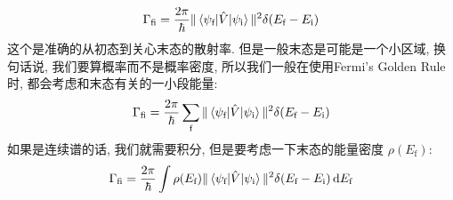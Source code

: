 \begin{equation}
  \Gamma_{\text{fi}} = \frac{2\pi}{\hbar} \|\mel{\psi_{\text{f}}}{\hat{V}}{\psi_{\text{i}}}\|^2 \delta(E_{\text{f}} - E_{\text{i}})
\end{equation}
这个是准确的从初态到关心末态的散射率.
但是一般末态是可能是一个小区域, 换句话说, 我们要算概率而不是概率密度, 所以我们一般在使用Fermi's Golden Rule时, 都会考虑和末态有关的一小段能量:
\begin{equation}
  \Gamma_{\text{fi}} = \frac{2\pi}{\hbar} \sum_{\text{f}} \|\mel{\psi_{\text{f}}}{\hat{V}}{\psi_{\text{i}}}\|^2 \delta(E_{\text{f}} - E_{\text{i}})
\end{equation}
如果是连续谱的话, 我们就需要积分, 但是要考虑一下末态的能量密度 $\rho(E_{\text{f}})$:
\begin{equation}
  \Gamma_{\text{fi}} = \frac{2\pi}{\hbar} \int \rho(E_{\text{f}}) \|\mel{\psi_{\text{f}}}{\hat{V}}{\psi_{\text{i}}}\|^2 \delta(E_{\text{f}} - E_{\text{i}}) \dd{E_{\text{f}}} 
\end{equation}


